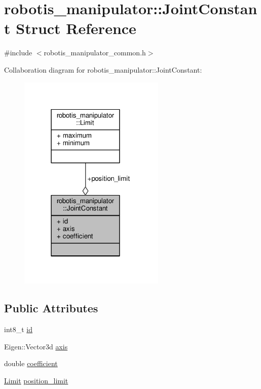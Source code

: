 \hypertarget{structrobotis__manipulator_1_1_joint_constant}{}\section{robotis\+\_\+manipulator\+:\+:Joint\+Constant Struct Reference}
\label{structrobotis__manipulator_1_1_joint_constant}


{\ttfamily \#include $<$robotis\+\_\+manipulator\+\_\+common.\+h$>$}



Collaboration diagram for robotis\+\_\+manipulator\+:\+:Joint\+Constant\+:\nopagebreak
\begin{figure}[H]
\begin{center}
\leavevmode
\includegraphics[width=198pt]{structrobotis__manipulator_1_1_joint_constant__coll__graph}
\end{center}
\end{figure}
\subsection*{Public Attributes}
\begin{DoxyCompactItemize}
\item 
int8\+\_\+t \hyperlink{structrobotis__manipulator_1_1_joint_constant_ac4e09e4e2886029c58d6f727e9b1e274}{id}
\item 
Eigen\+::\+Vector3d \hyperlink{structrobotis__manipulator_1_1_joint_constant_aa3bf091d44be75bd46e5052fd32fccc6}{axis}
\item 
double \hyperlink{structrobotis__manipulator_1_1_joint_constant_acd88ff436867374790745f4661b12821}{coefficient}
\item 
\hyperlink{structrobotis__manipulator_1_1_limit}{Limit} \hyperlink{structrobotis__manipulator_1_1_joint_constant_a15c9d0a10c81d861a1d4762b0f9a790d}{position\+\_\+limit}
\end{DoxyCompactItemize}


